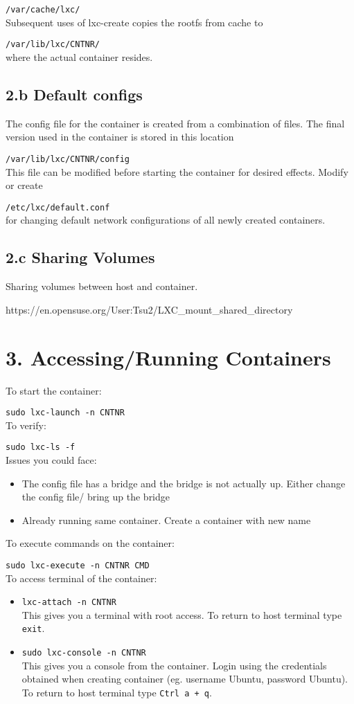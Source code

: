 \documentclass{report}
\begin{document}
\texttt{/var/cache/lxc/} \\
Subsequent uses of lxc-create copies the rootfs from cache to 

\texttt{/var/lib/lxc/CNTNR/} \\ 
where the actual container resides.

\subsection*{2.b Default configs}
The config file for the container is created from a combination of files. The final version used in the container is stored in this location 

\texttt{/var/lib/lxc/CNTNR/config} \\
This file can be modified before starting the container for desired effects. Modify or create

 \texttt{/etc/lxc/default.conf} \\ for changing default network configurations of all newly created containers.
	
\subsection*{2.c Sharing Volumes}
Sharing volumes between host and container.

https://en.opensuse.org/User:Tsu2/LXC\_mount\_shared\_directory

\section*{3. Accessing/Running Containers}
To start the container:

\texttt{sudo lxc-launch -n CNTNR} \\
To verify:

\texttt{sudo lxc-ls -f} \\
Issues you could face:
\begin{itemize}
\item The config file has a bridge and the bridge is not actually up. Either change the config file/ bring up the bridge
\item Already running same container. Create a container with new name \\
\end{itemize}
To execute commands on the container:

\texttt{sudo lxc-execute -n CNTNR CMD} \\
To access terminal of the container:
\begin{itemize}
\item \texttt{lxc-attach -n CNTNR} \\
This gives you a terminal with root access. To return to host terminal type \texttt{exit}.

\item \texttt{sudo lxc-console -n CNTNR}\\
This gives you a console from the container. Login using the credentials obtained when creating container (eg. username Ubuntu, password  Ubuntu). To return to host terminal type \texttt{Ctrl a + q}.
\end{itemize}
\end{document}
